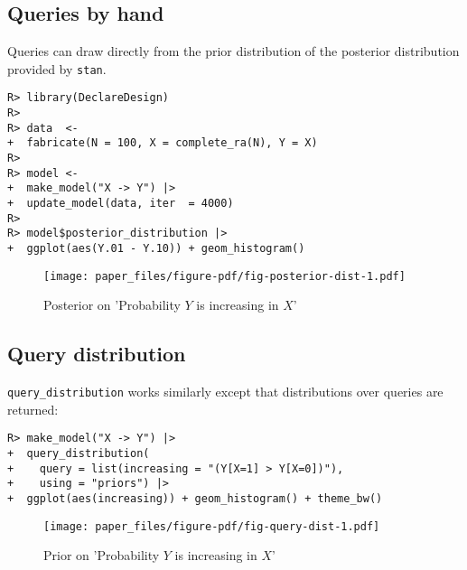 \documentclass[
  11pt,
  article]{jss}
\begin{document}
\hypertarget{queries-by-hand}{%
\subsection{Queries by hand}\label{queries-by-hand}}

Queries can draw directly from the prior distribution of the posterior
distribution provided by \texttt{stan}.

\begin{verbatim}
R> library(DeclareDesign)
R> 
R> data  <- 
+  fabricate(N = 100, X = complete_ra(N), Y = X)
R> 
R> model <- 
+  make_model("X -> Y") |>
+  update_model(data, iter  = 4000)
R> 
R> model$posterior_distribution |> 
+  ggplot(aes(Y.01 - Y.10)) + geom_histogram()
\end{verbatim}

\begin{figure}[h]

{\centering \texttt{[image: paper\_files/figure-pdf/fig-posterior-dist-1.pdf]}

}

\caption{\label{fig-posterior-dist}Posterior on 'Probability \(Y\) is
increasing in \(X\)'}

\end{figure}

\FloatBarrier

\hypertarget{query-distribution}{%
\subsection{Query distribution}\label{query-distribution}}

\texttt{query\_distribution} works similarly except that distributions
over queries are returned:

\begin{verbatim}
R> make_model("X -> Y") |> 
+  query_distribution(
+    query = list(increasing = "(Y[X=1] > Y[X=0])"), 
+    using = "priors") |>
+  ggplot(aes(increasing)) + geom_histogram() + theme_bw()
\end{verbatim}

\begin{figure}[h]

{\centering \texttt{[image: paper\_files/figure-pdf/fig-query-dist-1.pdf]}

}

\caption{\label{fig-query-dist}Prior on 'Probability \(Y\) is increasing
in \(X\)'}

\end{figure}
\end{document}
